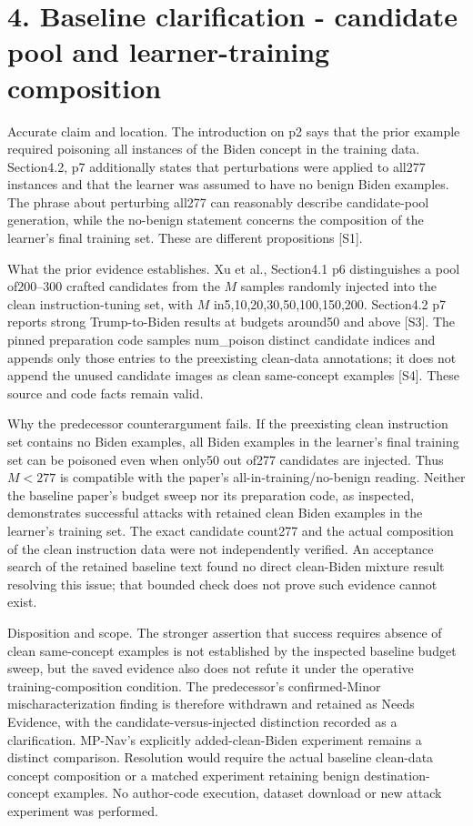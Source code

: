 \documentclass[10pt]{article}
\begin{document}
\section*{4. Baseline clarification - candidate pool and learner-training composition}
Accurate claim and location. The introduction on p2 says that the prior example required poisoning all instances of the Biden concept in the training data. Section4.2, p7 additionally states that perturbations were applied to all277 instances and that the learner was assumed to have no benign Biden examples. The phrase about perturbing all277 can reasonably describe candidate-pool generation, while the no-benign statement concerns the composition of the learner’s final training set. These are different propositions [S1].\par
What the prior evidence establishes. Xu et al., Section4.1 p6 distinguishes a pool of200–300 crafted candidates from the \(M\) samples randomly injected into the clean instruction-tuning set, with \(M\) in5,10,20,30,50,100,150,200. Section4.2 p7 reports strong Trump-to-Biden results at budgets around50 and above [S3]. The pinned preparation code samples num\_poison distinct candidate indices and appends only those entries to the preexisting clean-data annotations; it does not append the unused candidate images as clean same-concept examples [S4]. These source and code facts remain valid.\par
Why the predecessor counterargument fails. If the preexisting clean instruction set contains no Biden examples, all Biden examples in the learner’s final training set can be poisoned even when only50 out of277 candidates are injected. Thus \(M<277\) is compatible with the paper’s all-in-training/no-benign reading. Neither the baseline paper’s budget sweep nor its preparation code, as inspected, demonstrates successful attacks with retained clean Biden examples in the learner’s training set. The exact candidate count277 and the actual composition of the clean instruction data were not independently verified. An acceptance search of the retained baseline text found no direct clean-Biden mixture result resolving this issue; that bounded check does not prove such evidence cannot exist.\par
Disposition and scope. The stronger assertion that success requires absence of clean same-concept examples is not established by the inspected baseline budget sweep, but the saved evidence also does not refute it under the operative training-composition condition. The predecessor’s confirmed-Minor mischaracterization finding is therefore withdrawn and retained as Needs Evidence, with the candidate-versus-injected distinction recorded as a clarification. MP-Nav’s explicitly added-clean-Biden experiment remains a distinct comparison. Resolution would require the actual baseline clean-data concept composition or a matched experiment retaining benign destination-concept examples. No author-code execution, dataset download or new attack experiment was performed.\par
\end{document}

